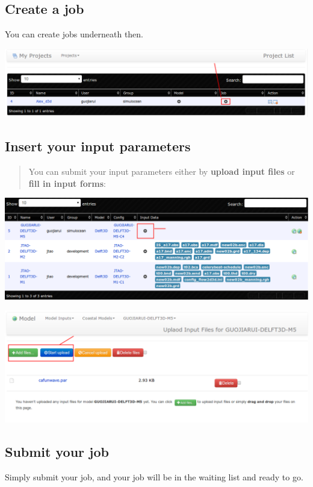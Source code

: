 \documentclass[letterpaper,10pt,openany, oneside]{sphinxmanual}
\begin{document}
\subsection{Create a \textbf{job}}
\label{demo:create-a-job}
You can create jobs underneath then.

{\hfill\includegraphics{cjob1.png}\hfill}


\subsection{\textbf{Insert} your input parameters}
\label{demo:insert-your-input-parameters}\begin{quote}

You can submit your input parameters either by \textbf{upload input files} or \textbf{fill in input forms}:
\end{quote}

{\hfill\includegraphics{cinput1.png}\hfill}

{\hfill\includegraphics{cinput2.png}\hfill}


\subsection{\textbf{Submit} your job}
\label{demo:submit-your-job}
Simply submit your job, and your job will be in the waiting list and ready to go.
\end{document}
